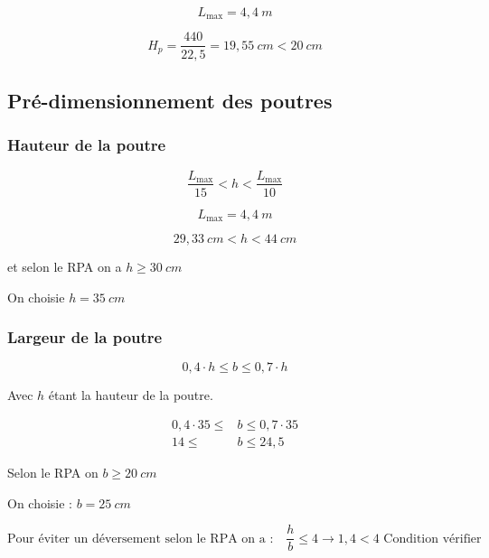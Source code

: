 \documentclass[12pt,a4paper]{article}
\begin{document}
	\[ L_{\max} = 4,4~\unit{m}  \]
	
	\[ H_{p} = \dfrac{440}{22,5} = 19,55~\unit{cm} < 20~\unit{cm} \]
	
	
	
	
	
	\subsection{Pré-dimensionnement des poutres}
	
	
	
	
	
	
	
	\subsubsection{Hauteur de la poutre}
	
	\[ \dfrac{L_{\max}}{15} < h < \dfrac{L_{\max}}{10} \]
	
	
	
	\[ L_{\max} = 4,4~\unit{m} \]
	
	\[ 29,33~\unit{cm} < h < 44~\unit{cm} \]
	
	et selon le RPA on a $h \geq 30~\unit{cm}$
	
	
	
	On choisie $h = 35~\unit{cm}$
	
	
	

	
	
	
	\subsubsection{Largeur de la poutre}
	
	
	
	\[ 0,4 \cdot h \leq b \leq 0,7 \cdot h \]
	
	
	Avec $h$ étant la hauteur de la poutre.
	
	\[
	\begin{aligned}
		0,4 \cdot 35 \leq &b \leq 0,7 \cdot 35 \\
		14 \leq &b \leq 24,5
	\end{aligned}  
	\]
	
	Selon le RPA on $b \geq 20~\unit{cm}$
	
	On choisie : $b = 25~\unit{cm}$
	
	\vspace{\baselineskip}
	
	\[ \text{Pour éviter un déversement selon le RPA on a :} \quad \dfrac{h}{b} \leq 4 \longrightarrow 1,4 < 4 \text{ Condition vérifier} \]
	
\end{document}
